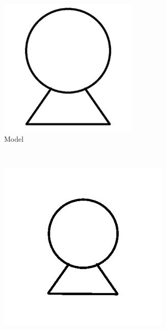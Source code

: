     \begin{figure}[h]
        \centering
                \begin{subfigure}[b]{0.2\textwidth}
                \centering
                \includegraphics[width=0.73\textwidth]{figures/Results/Sketches50/Model.png} 
                \caption{Model}
        \end{subfigure}\\
                \begin{subfigure}[b]{0.25\textwidth}
                \centering
                \includegraphics[width=0.9\textwidth]{figures/Results/Sketches50/level1.png}

\end{subfigure}
\end{figure}
